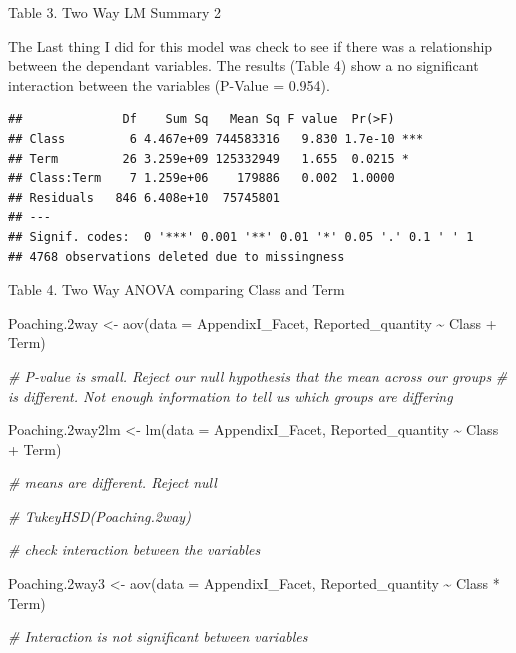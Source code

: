 \documentclass[
  12pt,
]{article}
\newenvironment{Shaded}{\begin{snugshade}}{\end{snugshade}}
\newcommand{\AttributeTok}[1]{\textcolor[rgb]{0.77,0.63,0.00}{#1}}
\newcommand{\CommentTok}[1]{\textcolor[rgb]{0.56,0.35,0.01}{\textit{#1}}}
\newcommand{\FloatTok}[1]{\textcolor[rgb]{0.00,0.00,0.81}{#1}}
\newcommand{\FunctionTok}[1]{\textcolor[rgb]{0.00,0.00,0.00}{#1}}
\newcommand{\NormalTok}[1]{#1}
\newcommand{\OtherTok}[1]{\textcolor[rgb]{0.56,0.35,0.01}{#1}}
\newcommand{\SpecialCharTok}[1]{\textcolor[rgb]{0.00,0.00,0.00}{#1}}
\begin{document}
Table 3. Two Way LM Summary 2

The Last thing I did for this model was check to see if there was a
relationship between the dependant variables. The results (Table 4) show
a no significant interaction between the variables (P-Value = 0.954).

\begin{verbatim}
##              Df    Sum Sq   Mean Sq F value  Pr(>F)    
## Class         6 4.467e+09 744583316   9.830 1.7e-10 ***
## Term         26 3.259e+09 125332949   1.655  0.0215 *  
## Class:Term    7 1.259e+06    179886   0.002  1.0000    
## Residuals   846 6.408e+10  75745801                    
## ---
## Signif. codes:  0 '***' 0.001 '**' 0.01 '*' 0.05 '.' 0.1 ' ' 1
## 4768 observations deleted due to missingness
\end{verbatim}

Table 4. Two Way ANOVA comparing Class and Term

\begin{Shaded}
\begin{Highlighting}[]
\NormalTok{Poaching}\FloatTok{.2}\NormalTok{way }\OtherTok{\textless{}{-}} \FunctionTok{aov}\NormalTok{(}\AttributeTok{data =}\NormalTok{ AppendixI\_Facet, Reported\_quantity }\SpecialCharTok{\textasciitilde{}}\NormalTok{ Class }\SpecialCharTok{+}\NormalTok{ Term)}

\CommentTok{\# P{-}value is small. Reject our null hypothesis that the mean across our groups}
\CommentTok{\# is different.  Not enough information to tell us which groups are differing}

\NormalTok{Poaching}\FloatTok{.2}\NormalTok{way2lm }\OtherTok{\textless{}{-}} \FunctionTok{lm}\NormalTok{(}\AttributeTok{data =}\NormalTok{ AppendixI\_Facet, Reported\_quantity }\SpecialCharTok{\textasciitilde{}}\NormalTok{ Class }\SpecialCharTok{+}\NormalTok{ Term)}

\CommentTok{\# means are different. Reject null}

\CommentTok{\# TukeyHSD(Poaching.2way)}

\CommentTok{\# check interaction between the variables}

\NormalTok{Poaching}\FloatTok{.2}\NormalTok{way3 }\OtherTok{\textless{}{-}} \FunctionTok{aov}\NormalTok{(}\AttributeTok{data =}\NormalTok{ AppendixI\_Facet, Reported\_quantity }\SpecialCharTok{\textasciitilde{}}\NormalTok{ Class }\SpecialCharTok{*}\NormalTok{ Term)}

\CommentTok{\# Interaction is not significant between variables}
\end{Highlighting}
\end{Shaded}
\end{document}
